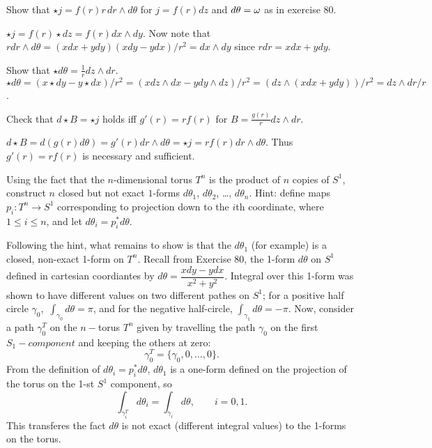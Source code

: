 \begin{p}%
{Show that $\star j=f(r)r\,dr\wedge d\theta$ for $j=f(r)dz$ and $d\theta=\omega$ as in exercise 80.}
\end{p}
{$\star j=f(r)\star dz=f(r)dx\wedge dy$. Now note that $r dr\wedge d\theta=(xdx+ydy)(xdy-ydx)/r^2=dx\wedge dy$ since $r dr=xdx+ydy$.}

\begin{p}%
{Show that $\star d\theta=\frac{1}{r}dz\wedge dr$.}{$\star d\theta=(x\star dy-y\star dx)/r^2=(xdz\wedge dx-ydy\wedge dz)/r^2=(dz\wedge(xdx+ydy))/r^2=dz\wedge dr/r$.}
\end{p}

\begin{p}%
{Check that $d\star B=\star j$ holds iff $g'(r)=rf(r)$ for $B=\frac{g(r)}{r} dz\wedge dr$.}
\end{p}
{$d\star B=d(g(r)d\theta)=g'(r)dr\wedge d\theta=\star j=rf(r)dr\wedge d\theta.$ Thus $g'(r)=rf(r)$ is necessary and sufficient.}

\begin{p}%
Using the fact that the $n$-dimensional torus $T^n$ is the product of $n$ copies of $S^1$, construct $n$ closed but not exact $1$-forms $d\theta_1$, $d\theta_2$, \dots, $d\theta_n$. Hint: define maps $p_i:T^n\to S^1$ corresponding to projection down to the $i$th coordinate, where $1\leq i\leq n$, and let $d\theta_i=p_i^*d\theta$.
\end{p}
{Following the hint, what remains to show is that the $d\theta_1$ (for example) is a closed, non-exact 1-form on $T^n$. Recall from Exercise 80, the 1-form $d\theta$ on $S^1$ defined in cartesian coordiantes by $d\theta = \dfrac{xdy-ydx}{x^2+y^2}$. Integral over this 1-form  was shown to have different values on two different pathes on $S^1$; for a positive half circle $\gamma_0$, $\,\int_{\gamma_0}d\theta = \pi$, and for the negative half-circle, $\int_{\gamma_1}d\theta = -\pi$.
Now, consider a path $\gamma_0^T$ on the $n-$torus $T^n$ given by travelling the path $\gamma_0$ on the first $S_1-component$ and keeping the others at zero:
$$
\gamma_0^T = \{\gamma_0, 0, ..., 0\}.
$$
From the definition of $d\theta_i=p_i^*d\theta$, $d\theta_1$ is a one-form defined on the projection of the torus on the 1-st $S^1$ component, so 
$$ 
\int_{\gamma_i^T}d\theta_i = \int_{\gamma_i}d\theta, \qquad i=0,1.
$$
}
This transferes the fact $d\theta$ is not exact (different integral values) to the 1-forms on the torus. 

\begin{p}
\end{p}


\begin{p}
\end{p}


\begin{p}
\end{p}


\begin{p}
\end{p}


\begin{p}
\end{p}


\begin{p}
\end{p}


\begin{p}
\end{p}


\begin{p}%
\end{p}

